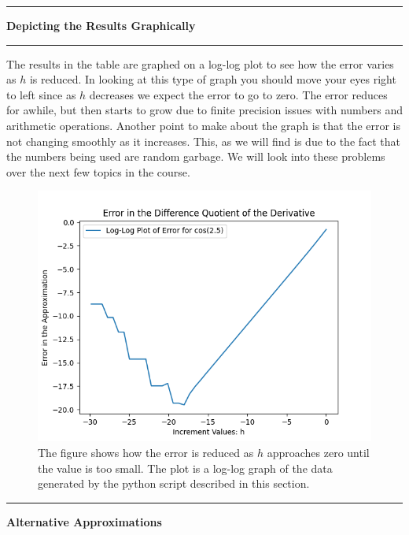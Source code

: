 \documentclass[10pt,fleqn]{article}
\begin{document}
\vskip0.1in\hrule\vskip0.1in \noindent
{\bf Depicting the Results Graphically}
\vskip0.1in\hrule\vskip0.1in \noindent
The results in the table are graphed on a log-log plot to see how the error
varies as \(h\) is reduced. In looking at this type of graph you should move
your eyes right to left since as \(h\) decreases we expect the error to go to
zero. The error reduces for awhile, but then starts to grow due to finite
precision issues with numbers and arithmetic operations. Another point to make
about the graph is that the error is not changing smoothly as it increases.
This, as we will find is due to the fact that the numbers being used are random
garbage. We will look into these problems over the next few topics in the
course.
\vfill
\begin{figure}[h]
\centering
\includegraphics{../images/diff_quotient_01.png}
\vskip0.1in
\caption{The figure shows how the error is reduced as \(h\) approaches zero
until the value is too small. The plot is a log-log graph of the data generated
by the python script described in this section.}
\end{figure}
\eject
\vskip0.1in\hrule\vskip0.1in \noindent
{\bf Alternative Approximations}
\end{document}

